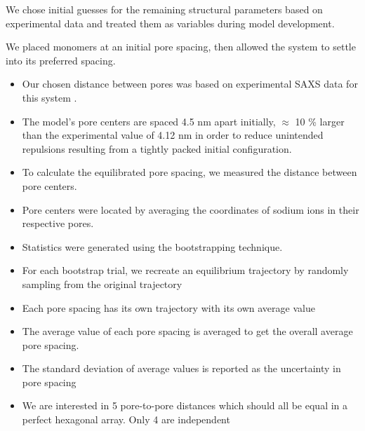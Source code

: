 \documentclass{article}
\begin{document}
  We chose initial guesses for the remaining structural parameters based on 
  experimental data and treated them as variables during model development.

  We placed monomers at an initial pore spacing, then allowed the system to settle 
  into its preferred spacing. 
  \begin{itemize}
    \item Our chosen distance between pores was based on experimental SAXS data for
    this system \cite{feng_thin_2016}.
    \item The model's pore centers are spaced 4.5 nm apart initially, $\approx$ 10 \% larger
    than the experimental value of 4.12 nm in order to reduce unintended repulsions 
    resulting from a tightly packed initial configuration.
    \item To calculate the equilibrated pore spacing, we measured the distance between pore
    centers.
    \item Pore centers were located by averaging the coordinates of sodium ions in their 
    respective pores.
    \item Statistics were generated using the bootstrapping technique.
    \item For each bootstrap trial, we recreate an equilibrium trajectory by randomly 
    sampling from the original trajectory
    \item Each pore spacing has its own trajectory with its own average value
    \item The average value of each pore spacing is averaged to get the overall
    average pore spacing. 
    \item The standard deviation of average values is reported as the uncertainty in pore spacing
    \item We are interested in 5 pore-to-pore distances which should all be equal in 
    a perfect hexagonal array. Only 4 are independent  
  \end{itemize}
  
\end{document}
